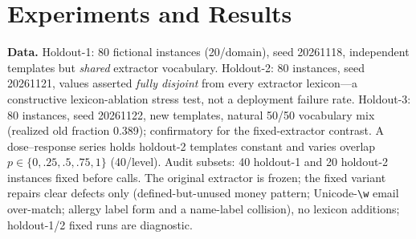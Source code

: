 \documentclass[conference]{IEEEtran}
\begin{document}
\section{Experiments and Results}
\textbf{Data.} Holdout-1: 80 fictional instances (20/domain), seed 20261118, independent templates but \emph{shared} extractor vocabulary. Holdout-2: 80 instances, seed 20261121, values asserted \emph{fully disjoint} from every extractor lexicon---a constructive lexicon-ablation stress test, not a deployment failure rate. Holdout-3: 80 instances, seed 20261122, new templates, natural 50/50 vocabulary mix (realized old fraction 0.389); confirmatory for the fixed-extractor contrast. A dose--response series holds holdout-2 templates constant and varies overlap $p\in\{0,.25,.5,.75,1\}$ (40/level). Audit subsets: 40 holdout-1 and 20 holdout-2 instances fixed before calls. The original extractor is frozen; the fixed variant repairs clear defects only (defined-but-unused money pattern; Unicode-\texttt{\textbackslash w} email over-match; allergy label form and a name-label collision), no lexicon additions; holdout-1/2 fixed runs are diagnostic.


\end{document}
